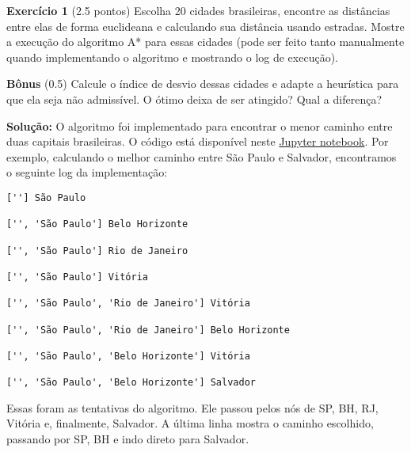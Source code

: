 \noindent \textbf{Exercício 1} (2.5 pontos) Escolha 20 cidades brasileiras, encontre as distâncias
entre elas de forma euclideana e calculando sua distância usando estradas.
Mostre a execução do algoritmo A* para essas cidades (pode ser feito
tanto manualmente quando implementando o algoritmo e mostrando o
log de execução).

\smallskip

\noindent \textbf{Bônus} (0.5) Calcule o índice de desvio dessas cidades e adapte a heurística
para que ela seja não admissível. O ótimo deixa de ser atingido? Qual a
diferença?

\bigskip

\noindent \textbf{Solução:} O algoritmo foi implementado para encontrar o menor caminho entre duas capitais brasileiras. O código está disponível neste \href{https://github.com/lucasresck/data-structures-algorithms/blob/main/notebooks/city_distances.ipynb}{Jupyter notebook}. Por exemplo, calculando o melhor caminho entre São Paulo e Salvador, encontramos o seguinte log da implementação:

\begin{verbatim}
[''] São Paulo

['', 'São Paulo'] Belo Horizonte

['', 'São Paulo'] Rio de Janeiro

['', 'São Paulo'] Vitória

['', 'São Paulo', 'Rio de Janeiro'] Vitória

['', 'São Paulo', 'Rio de Janeiro'] Belo Horizonte

['', 'São Paulo', 'Belo Horizonte'] Vitória

['', 'São Paulo', 'Belo Horizonte'] Salvador
\end{verbatim}

Essas foram as tentativas do algoritmo. Ele passou pelos nós de SP, BH, RJ, Vitória e, finalmente, Salvador. A última linha mostra o caminho escolhido, passando por SP, BH e indo direto para Salvador.
